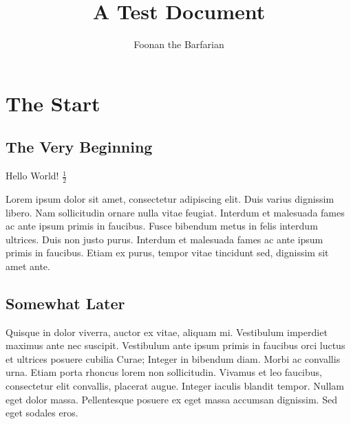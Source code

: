 \documentclass{article}
\begin{document}
\title{A Test Document}
\author{Foonan the Barfarian}

\section{The Start}
\subsection{The Very Beginning}
Hello World!
$\frac    {1}
2$

Lorem ipsum dolor sit amet, consectetur adipiscing elit. Duis varius dignissim libero. Nam sollicitudin ornare nulla vitae feugiat. Interdum et malesuada fames ac ante ipsum primis in faucibus. Fusce bibendum metus in felis interdum ultrices. Duis non justo purus. Interdum et malesuada fames ac ante ipsum primis in faucibus. Etiam ex purus, tempor vitae tincidunt sed, dignissim sit amet ante.

\subsection{Somewhat Later}
Quisque in dolor viverra, auctor ex vitae, aliquam mi. Vestibulum imperdiet maximus ante nec suscipit. Vestibulum ante ipsum primis in faucibus orci luctus et ultrices posuere cubilia Curae; Integer in bibendum diam. Morbi ac convallis urna. Etiam porta rhoncus lorem non sollicitudin. Vivamus et leo faucibus, consectetur elit convallis, placerat augue. Integer iaculis blandit tempor. Nullam eget dolor massa. Pellentesque posuere ex eget massa accumsan dignissim. Sed eget sodales eros.
\end{document}
